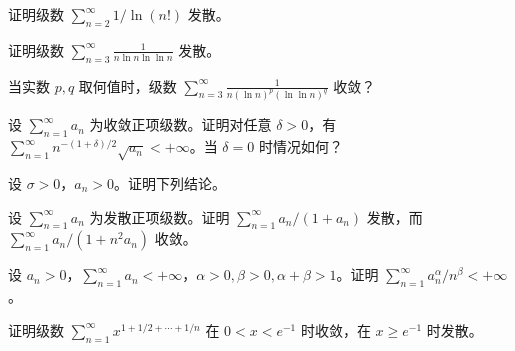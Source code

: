 \newpage
\noindent\begin{minipage}{\textwidth}
证明级数 $\sum_{n=2}^{\infty}1/\ln(n!)$ 发散。
\end{minipage}\par\vfill
\noindent\begin{minipage}{\textwidth}
证明级数 $\displaystyle\sum_{n=3}^{\infty}\frac1{n\ln n\ln\ln n}$ 发散。
\end{minipage}\par\vfill
\noindent\begin{minipage}{\textwidth}
当实数 $p,q$ 取何值时，级数 $\displaystyle\sum_{n=3}^{\infty}\frac1{n(\ln n)^p(\ln\ln n)^q}$ 收敛？
\end{minipage}\par\vfill
\newpage
\noindent\begin{minipage}{\textwidth}
设 $\sum_{n=1}^{\infty}a_n$ 为收敛正项级数。证明对任意 $\delta>0$，有 $\sum_{n=1}^{\infty}n^{-(1+\delta)/2}\sqrt{a_n}<+\infty$。当 $\delta=0$ 时情况如何？
\end{minipage}\par\vfill
\noindent\begin{minipage}{\textwidth}
设 $\sigma>0$，$a_n>0$。证明下列结论。
\end{minipage}\par\vfill
\noindent\begin{minipage}{\textwidth}
设 $\sum_{n=1}^{\infty}a_n$ 为发散正项级数。证明 $\sum_{n=1}^{\infty}a_n/(1+a_n)$ 发散，而 $\sum_{n=1}^{\infty}a_n/(1+n^2a_n)$ 收敛。
\end{minipage}\par\vfill
\newpage
\noindent\begin{minipage}{\textwidth}
设 $a_n>0$，$\sum_{n=1}^{\infty}a_n<+\infty$，$\alpha>0,\beta>0,\alpha+\beta>1$。证明 $\sum_{n=1}^{\infty}a_n^\alpha/n^\beta<+\infty$。
\end{minipage}\par\vfill
\noindent\begin{minipage}{\textwidth}
证明级数 $\sum_{n=1}^{\infty}x^{1+1/2+\cdots+1/n}$ 在 $0<x<e^{-1}$ 时收敛，在 $x\ge e^{-1}$ 时发散。
\end{minipage}\par\vfill
